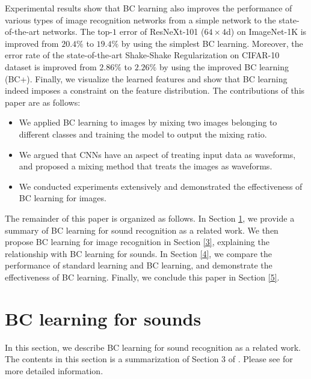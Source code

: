 \documentclass[10pt,twocolumn,letterpaper]{article}
\begin{document}
Experimental results show that BC learning also improves the performance of various types of image recognition networks from a simple network to the state-of-the-art networks. The top-$1$ error of ResNeXt-101 ($64\times4$d) \cite{xie2017aggregated} on ImageNet-1K is improved from $20.4\%$ to $19.4\%$ by using the simplest BC learning. Moreover, the error rate of the state-of-the-art Shake-Shake Regularization \cite{gastaldi2017shake} on CIFAR-10 dataset is improved from $2.86\%$ to $2.26\%$ by using the improved BC learning (BC+). Finally, we visualize the learned features and show that BC learning indeed imposes a constraint on the feature distribution. The contributions of this paper are as follows:
\begin{itemize}
\vspace{-1mm}
\setlength{\itemsep}{0cm} 
 \item{We applied BC learning \cite{tokozume2018learning} to images by mixing two images belonging to different classes and training the model to output the mixing ratio.} 
 \item{We argued that CNNs have an aspect of treating input data as waveforms, and proposed a mixing method that treats the images as waveforms.} 
 \item{We conducted experiments extensively and demonstrated the effectiveness of BC learning for images.} 
\end{itemize}

The remainder of this paper is organized as follows. In Section \ref{2}, we provide a summary of BC learning for sound recognition \cite{tokozume2018learning} as a related work. We then propose BC learning for image recognition in Section \ref{3}, explaining the relationship with BC learning for sounds. In Section \ref{4}, we compare the performance of standard learning and BC learning, and demonstrate the effectiveness of BC learning. Finally, we conclude this paper in Section \ref{5}.



\section{BC learning for sounds}\label{2}
In this section, we describe BC learning for sound recognition \cite{tokozume2018learning} as a related work. The contents in this section is a summarization of Section 3 of \cite{tokozume2018learning}. Please see \cite{tokozume2018learning} for more detailed information.  
\end{document}
